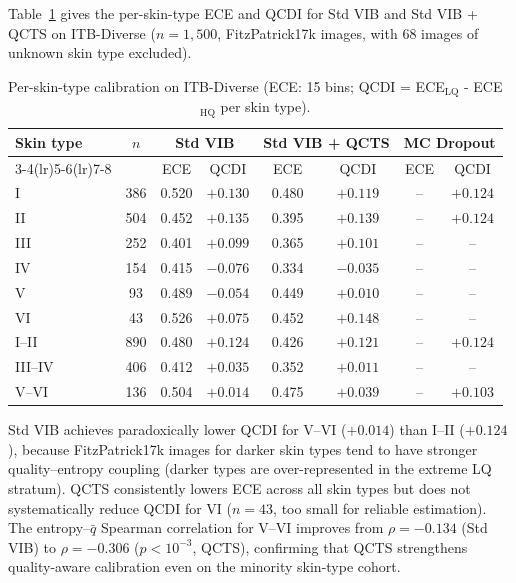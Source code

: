 \documentclass{bmvc2k}
\newcommand{\qbar}{\bar{q}}
\begin{document}
Table~\ref{tab:fairness_full} gives the per-skin-type ECE and QCDI for Std VIB and Std VIB + QCTS on ITB-Diverse ($n{=}1{,}500$, FitzPatrick17k images, with 68 images of unknown skin type excluded).

\begin{table}[h]
\centering
\caption{Per-skin-type calibration on ITB-Diverse (ECE: 15 bins; QCDI = ECE$_\text{LQ}$ - ECE$_\text{HQ}$ per skin type).}
\label{tab:fairness_full}
\footnotesize
\begin{tabular}{lccccccc}
\toprule
Skin type & $n$ & \multicolumn{2}{c}{Std VIB} & \multicolumn{2}{c}{Std VIB + QCTS} & \multicolumn{2}{c}{MC Dropout} \\
\cmidrule(lr){3-4}\cmidrule(lr){5-6}\cmidrule(lr){7-8}
& & ECE & QCDI & ECE & QCDI & ECE & QCDI \\
\midrule
I   & 386 & 0.520 & $+0.130$ & 0.480 & $+0.119$ & -- & $+0.124$ \\
II  & 504 & 0.452 & $+0.135$ & 0.395 & $+0.139$ & -- & $+0.124$ \\
III & 252 & 0.401 & $+0.099$ & 0.365 & $+0.101$ & -- & -- \\
IV  & 154 & 0.415 & $-0.076$ & 0.334 & $-0.035$ & -- & -- \\
V   &  93 & 0.489 & $-0.054$ & 0.449 & $+0.010$ & -- & -- \\
VI  &  43 & 0.526 & $+0.075$ & 0.452 & $+0.148$ & -- & -- \\
\midrule
I--II  & 890 & 0.480 & $+0.124$ & 0.426 & $+0.121$ & -- & $+0.124$ \\
III--IV& 406 & 0.412 & $+0.035$ & 0.352 & $+0.011$ & -- & -- \\
V--VI  & 136 & 0.504 & $+0.014$ & 0.475 & $+0.039$ & -- & $+0.103$ \\
\bottomrule
\end{tabular}
\end{table}

Std VIB achieves paradoxically lower QCDI for V--VI ($+0.014$) than I--II ($+0.124$), because FitzPatrick17k images for darker skin types tend to have stronger quality--entropy coupling (darker types are over-represented in the extreme LQ stratum). QCTS consistently lowers ECE across all skin types but does not systematically reduce QCDI for VI ($n{=}43$, too small for reliable estimation). The entropy--$\qbar$ Spearman correlation for V--VI improves from $\rho{=}{-}0.134$ (Std VIB) to $\rho{=}{-}0.306$ ($p{<}10^{-3}$, QCTS), confirming that QCTS strengthens quality-aware calibration even on the minority skin-type cohort.
\end{document}

